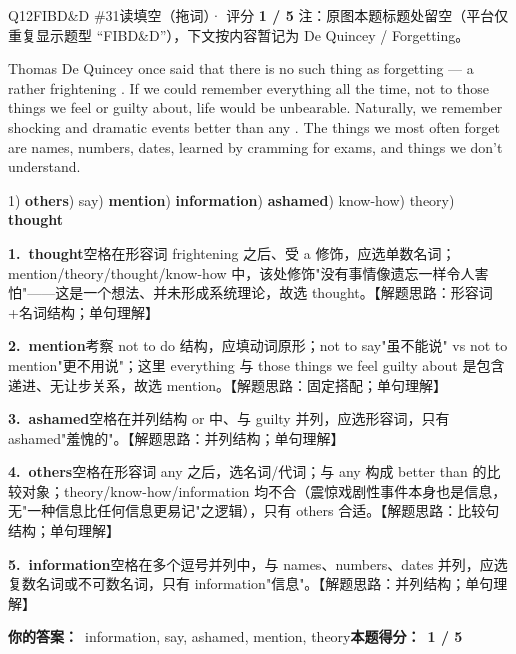 \begin{qblock}{Q12\quad FIBD\&D \#31}{读填空（拖词）· 评分 \textcolor{cAccent}{\bfseries 1 / 5}}
{\footnotesize\color{gray} 注：原图本题标题处留空（平台仅重复显示题型 ``FIBD\&D''），下文按内容暂记为 De Quincey / Forgetting。}
\begin{promptbox}
Thomas De Quincey once said that there is no such thing as forgetting --- a rather frightening . If we could remember everything all the time, not to  those things we feel  or guilty about, life would be unbearable. Naturally, we remember shocking and dramatic events better than any . The things we most often forget are names, numbers, dates,  learned by cramming for exams, and things we don't understand.
\end{promptbox}
{\small 1) \textbf{others}) say) \textbf{mention}) \textbf{information}) \textbf{ashamed}) know-how) theory) \textbf{thought}}
\begin{notebox}\footnotesize
\textbf{1.\ thought}\quad 空格在形容词 frightening 之后、受 a 修饰，应选单数名词；mention/theory/thought/know-how 中，该处修饰"没有事情像遗忘一样令人害怕"——这是一个想法、并未形成系统理论，故选 thought。【解题思路：形容词+名词结构；单句理解】\par\smallskip
\textbf{2.\ mention}\quad 考察 not to do 结构，应填动词原形；not to say"虽不能说" vs not to mention"更不用说"；这里 everything 与 those things we feel guilty about 是包含递进、无让步关系，故选 mention。【解题思路：固定搭配；单句理解】\par\smallskip
\textbf{3.\ ashamed}\quad 空格在并列结构 or 中、与 guilty 并列，应选形容词，只有 ashamed"羞愧的"。【解题思路：并列结构；单句理解】\par\smallskip
\textbf{4.\ others}\quad 空格在形容词 any 之后，选名词/代词；与 any 构成 better than 的比较对象；theory/know-how/information 均不合（震惊戏剧性事件本身也是信息，无"一种信息比任何信息更易记"之逻辑），只有 others 合适。【解题思路：比较句结构；单句理解】\par\smallskip
\textbf{5.\ information}\quad 空格在多个逗号并列中，与 names、numbers、dates 并列，应选复数名词或不可数名词，只有 information"信息"。【解题思路：并列结构；单句理解】
\end{notebox}
\smallskip
\textbf{你的答案：}\ {\color{cWrong}information, say}, ashamed, {\color{cWrong}mention, theory}\qquad\textbf{本题得分：}\ {\color{cAccent}\bfseries 1 / 5}
\end{qblock}

